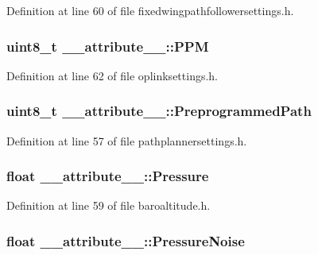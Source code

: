 \-Definition at line 60 of file fixedwingpathfollowersettings.\-h.

\hypertarget{struct____attribute_____a1c4b93594b3d978ec8e9795d44c8cdbe}{
\subsubsection[{\-P\-P\-M}]{\setlength{\rightskip}{0pt plus 5cm}uint8\-\_\-t {\bf \-\_\-\-\_\-attribute\-\_\-\-\_\-\-::\-P\-P\-M}}}\label{struct____attribute_____a1c4b93594b3d978ec8e9795d44c8cdbe}


\-Definition at line 62 of file oplinksettings.\-h.

\hypertarget{struct____attribute_____afc0b0538f8fc87b4787c646fae4ee0c2}{
\subsubsection[{\-Preprogrammed\-Path}]{\setlength{\rightskip}{0pt plus 5cm}uint8\-\_\-t {\bf \-\_\-\-\_\-attribute\-\_\-\-\_\-\-::\-Preprogrammed\-Path}}}\label{struct____attribute_____afc0b0538f8fc87b4787c646fae4ee0c2}


\-Definition at line 57 of file pathplannersettings.\-h.

\hypertarget{struct____attribute_____a33eaa721e15f34cc3fa2400492af646c}{
\subsubsection[{\-Pressure}]{\setlength{\rightskip}{0pt plus 5cm}float {\bf \-\_\-\-\_\-attribute\-\_\-\-\_\-\-::\-Pressure}}}\label{struct____attribute_____a33eaa721e15f34cc3fa2400492af646c}


\-Definition at line 59 of file baroaltitude.\-h.

\hypertarget{struct____attribute_____a6db1c1f224f8afefb3eb0aebb9b01693}{
\subsubsection[{\-Pressure\-Noise}]{\setlength{\rightskip}{0pt plus 5cm}float {\bf \-\_\-\-\_\-attribute\-\_\-\-\_\-\-::\-Pressure\-Noise}}}\label{struct____attribute_____a6db1c1f224f8afefb3eb0aebb9b01693}


